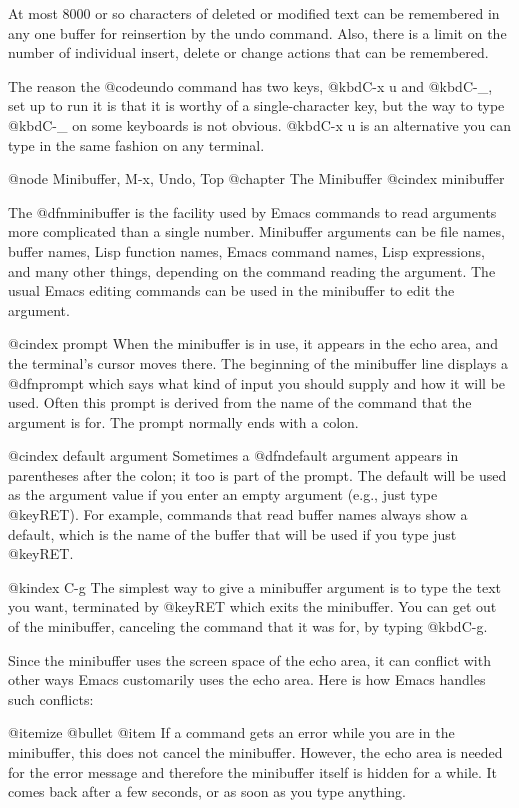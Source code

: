 {{{{{{  At most 8000 or so characters of deleted or modified text can be
remembered in any one buffer for reinsertion by the undo command.  Also,
there is a limit on the number of individual insert, delete or change
actions that can be remembered.

  The reason the @code{undo} command has two keys, @kbd{C-x u} and @kbd{C-_}, set
up to run it is that it is worthy of a single-character key, but the way to
type @kbd{C-_} on some keyboards is not obvious.  @kbd{C-x u} is an alternative
you can type in the same fashion on any terminal.

@node Minibuffer, M-x, Undo, Top
@chapter The Minibuffer
@cindex minibuffer

  The @dfn{minibuffer} is the facility used by Emacs commands to read
arguments more complicated than a single number.  Minibuffer arguments can
be file names, buffer names, Lisp function names, Emacs command names, Lisp
expressions, and many other things, depending on the command reading the
argument.  The usual Emacs editing commands can be used in the minibuffer
to edit the argument.

@cindex prompt
  When the minibuffer is in use, it appears in the echo area, and the
terminal's cursor moves there.  The beginning of the minibuffer line
displays a @dfn{prompt} which says what kind of input you should supply and
how it will be used.  Often this prompt is derived from the name of the
command that the argument is for.  The prompt normally ends with a colon.

@cindex default argument
  Sometimes a @dfn{default argument} appears in parentheses after the
colon; it too is part of the prompt.  The default will be used as the
argument value if you enter an empty argument (e.g., just type @key{RET}).
For example, commands that read buffer names always show a default, which
is the name of the buffer that will be used if you type just @key{RET}.

@kindex C-g
  The simplest way to give a minibuffer argument is to type the text you
want, terminated by @key{RET} which exits the minibuffer.  You can get out
of the minibuffer, canceling the command that it was for, by typing
@kbd{C-g}.

  Since the minibuffer uses the screen space of the echo area, it can
conflict with other ways Emacs customarily uses the echo area.  Here is how
Emacs handles such conflicts:

@itemize @bullet
@item
If a command gets an error while you are in the minibuffer, this does
not cancel the minibuffer.  However, the echo area is needed for the
error message and therefore the minibuffer itself is hidden for a
while.  It comes back after a few seconds, or as soon as you type
anything.

}}}}}}
